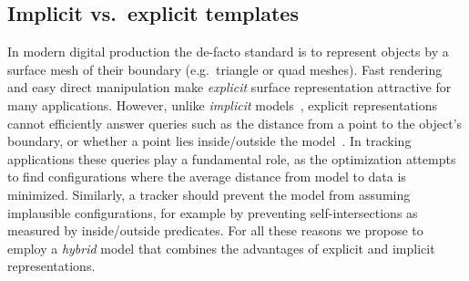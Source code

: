 

\subsection*{Implicit vs.\ explicit templates}
In modern digital production the de-facto standard is to represent objects by a surface mesh of their boundary (e.g.\ triangle or quad meshes). Fast rendering and easy direct manipulation make \emph{explicit} surface representation attractive for many applications.
%
However, unlike \emph{implicit} models~\cite{bloomenthal1997book}, explicit representations cannot efficiently answer queries such as the distance from a point to the object's boundary, or whether a point lies inside/outside the model~\cite[Ch.1]{botsch2010polygon}. In tracking applications these queries play a fundamental role, as the optimization attempts to find configurations where the average distance from model to data is minimized. Similarly, a tracker should prevent the model from assuming implausible configurations, for example by preventing self-intersections as measured by inside/outside predicates. For all these reasons 
 we propose to employ a \emph{hybrid} model that combines the advantages of explicit and implicit representations.


